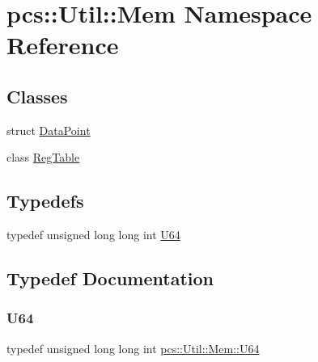 \hypertarget{namespacepcs_1_1Util_1_1Mem}{}\section{pcs\+:\+:Util\+:\+:Mem Namespace Reference}
\label{namespacepcs_1_1Util_1_1Mem}
\subsection*{Classes}
\begin{DoxyCompactItemize}
\item 
struct \hyperlink{structpcs_1_1Util_1_1Mem_1_1DataPoint}{Data\+Point}
\item 
class \hyperlink{classpcs_1_1Util_1_1Mem_1_1RegTable}{Reg\+Table}
\end{DoxyCompactItemize}
\subsection*{Typedefs}
\begin{DoxyCompactItemize}
\item 
typedef unsigned long long int \hyperlink{namespacepcs_1_1Util_1_1Mem_ab390aefcd13d26db4db397b784b4b9c6}{U64}
\end{DoxyCompactItemize}


\subsection{Typedef Documentation}
\mbox{\label{namespacepcs_1_1Util_1_1Mem_ab390aefcd13d26db4db397b784b4b9c6}} 
\subsubsection{\texorpdfstring{U64}{U64}}
{\footnotesize\ttfamily typedef unsigned long long int \hyperlink{namespacepcs_1_1Util_1_1Mem_ab390aefcd13d26db4db397b784b4b9c6}{pcs\+::\+Util\+::\+Mem\+::\+U64}}

